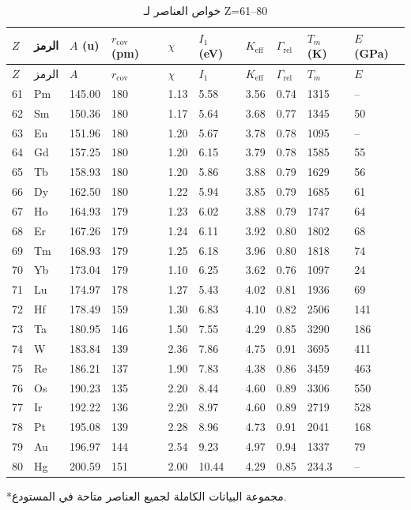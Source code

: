 \documentclass[11pt,a4paper]{article}
\newcommand{\Keff}{K_{\mathrm{eff}}}
\begin{document}
\begin{otherlanguage}{arabic}
		\begin{longtable}{p{0.6cm}p{1.2cm}p{1.2cm}p{1.2cm}p{1.2cm}p{1.2cm}p{1.5cm}p{1.2cm}p{1.2cm}p{1.2cm}}
			\caption{خواص العناصر لـ Z=61–80} \label{tab:elem-data-61to80} \\
			\toprule
			\(Z\) & الرمز & \(A\) (u) & \(r_{\text{cov}}\) (pm) & \(\chi\) & \(I_1\) (eV) & \(\Keff\) & \(\Gamma_{\text{rel}}\) & \(T_m\) (K) & \(E\) (GPa) \\
			\midrule
			\endfirsthead
			\toprule
			\(Z\) & الرمز & \(A\) & \(r_{\text{cov}}\) & \(\chi\) & \(I_1\) & \(\Keff\) & \(\Gamma_{\text{rel}}\) & \(T_m\) & \(E\) \\
			\midrule
			\endhead
			61 & Pm & 145.00 & 180 & 1.13 & 5.58 & 3.56 & 0.74 & 1315 & – \\
			62 & Sm & 150.36 & 180 & 1.17 & 5.64 & 3.68 & 0.77 & 1345 & 50 \\
			63 & Eu & 151.96 & 180 & 1.20 & 5.67 & 3.78 & 0.78 & 1095 & – \\
			64 & Gd & 157.25 & 180 & 1.20 & 6.15 & 3.79 & 0.78 & 1585 & 55 \\
			65 & Tb & 158.93 & 180 & 1.20 & 5.86 & 3.88 & 0.79 & 1629 & 56 \\
			66 & Dy & 162.50 & 180 & 1.22 & 5.94 & 3.85 & 0.79 & 1685 & 61 \\
			67 & Ho & 164.93 & 179 & 1.23 & 6.02 & 3.88 & 0.79 & 1747 & 64 \\
			68 & Er & 167.26 & 179 & 1.24 & 6.11 & 3.92 & 0.80 & 1802 & 68 \\
			69 & Tm & 168.93 & 179 & 1.25 & 6.18 & 3.96 & 0.80 & 1818 & 74 \\
			70 & Yb & 173.04 & 179 & 1.10 & 6.25 & 3.62 & 0.76 & 1097 & 24 \\
			71 & Lu & 174.97 & 178 & 1.27 & 5.43 & 4.02 & 0.81 & 1936 & 69 \\
			72 & Hf & 178.49 & 159 & 1.30 & 6.83 & 4.10 & 0.82 & 2506 & 141 \\
			73 & Ta & 180.95 & 146 & 1.50 & 7.55 & 4.29 & 0.85 & 3290 & 186 \\
			74 & W  & 183.84 & 139 & 2.36 & 7.86 & 4.75 & 0.91 & 3695 & 411 \\
			75 & Re & 186.21 & 137 & 1.90 & 7.83 & 4.38 & 0.86 & 3459 & 463 \\
			76 & Os & 190.23 & 135 & 2.20 & 8.44 & 4.60 & 0.89 & 3306 & 550 \\
			77 & Ir & 192.22 & 136 & 2.20 & 8.97 & 4.60 & 0.89 & 2719 & 528 \\
			78 & Pt & 195.08 & 139 & 2.28 & 8.96 & 4.73 & 0.91 & 2041 & 168 \\
			79 & Au & 196.97 & 144 & 2.54 & 9.23 & 4.97 & 0.94 & 1337 & 79 \\
			80 & Hg & 200.59 & 151 & 2.00 & 10.44 & 4.29 & 0.85 & 234.3 & – \\
			\bottomrule
		\end{longtable}
		*مجموعة البيانات الكاملة لجميع العناصر متاحة في المستودع.
		

\end{otherlanguage}
\end{document}
